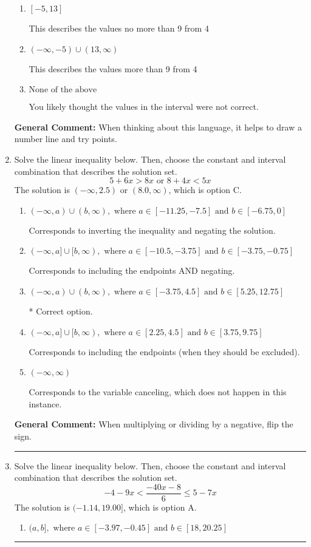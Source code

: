 \documentclass{extbook}[14pt]
\newcommand{\litem}[1]{\item #1

\rule{\textwidth}{0.4pt}}
\begin{document}
\begin{enumerate}
{\begin{enumerate}[label=\Alph*.]
This describes the values less than 9 from 4
\item \( [-5, 13] \)

This describes the values no more than 9 from 4
\item \( (-\infty, -5) \cup (13, \infty) \)

This describes the values more than 9 from 4
\item \( \text{None of the above} \)

You likely thought the values in the interval were not correct.
\end{enumerate}

\textbf{General Comment:} When thinking about this language, it helps to draw a number line and try points.
}
\litem{
Solve the linear inequality below. Then, choose the constant and interval combination that describes the solution set.
\[ 5 + 6 x > 8 x \text{ or } 8 + 4 x < 5 x \]The solution is \( (-\infty, 2.5) \text{ or } (8.0, \infty) \), which is option C.\begin{enumerate}[label=\Alph*.]
\item \( (-\infty, a) \cup (b, \infty), \text{ where } a \in [-11.25, -7.5] \text{ and } b \in [-6.75, 0] \)

Corresponds to inverting the inequality and negating the solution.
\item \( (-\infty, a] \cup [b, \infty), \text{ where } a \in [-10.5, -3.75] \text{ and } b \in [-3.75, -0.75] \)

Corresponds to including the endpoints AND negating.
\item \( (-\infty, a) \cup (b, \infty), \text{ where } a \in [-3.75, 4.5] \text{ and } b \in [5.25, 12.75] \)

 * Correct option.
\item \( (-\infty, a] \cup [b, \infty), \text{ where } a \in [2.25, 4.5] \text{ and } b \in [3.75, 9.75] \)

Corresponds to including the endpoints (when they should be excluded).
\item \( (-\infty, \infty) \)

Corresponds to the variable canceling, which does not happen in this instance.
\end{enumerate}

\textbf{General Comment:} When multiplying or dividing by a negative, flip the sign.
}
\litem{
Solve the linear inequality below. Then, choose the constant and interval combination that describes the solution set.
\[ -4 - 9 x < \frac{-40 x - 8}{6} \leq 5 - 7 x \]The solution is \( (-1.14, 19.00] \), which is option A.\begin{enumerate}[label=\Alph*.]
\item \( (a, b], \text{ where } a \in [-3.97, -0.45] \text{ and } b \in [18, 20.25] \)


\end{enumerate}}
\end{enumerate}
\end{document}
